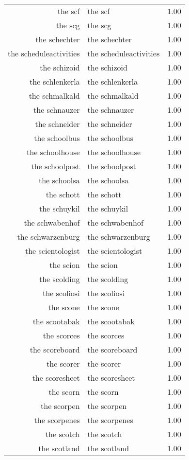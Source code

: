 \begin{table}[ht]
\begin{tabular}{rlr}
  the scf & the scf & 1.00 \\ 
  the scg & the scg & 1.00 \\ 
  the schechter & the schechter & 1.00 \\ 
  the scheduleactivities & the scheduleactivities & 1.00 \\ 
  the schizoid & the schizoid & 1.00 \\ 
  the schlenkerla & the schlenkerla & 1.00 \\ 
  the schmalkald & the schmalkald & 1.00 \\ 
  the schnauzer & the schnauzer & 1.00 \\ 
  the schneider & the schneider & 1.00 \\ 
  the schoolbus & the schoolbus & 1.00 \\ 
  the schoolhouse & the schoolhouse & 1.00 \\ 
  the schoolpost & the schoolpost & 1.00 \\ 
  the schoolsa & the schoolsa & 1.00 \\ 
  the schott & the schott & 1.00 \\ 
  the schuykil & the schuykil & 1.00 \\ 
  the schwabenhof & the schwabenhof & 1.00 \\ 
  the schwarzenburg & the schwarzenburg & 1.00 \\ 
  the scientologist & the scientologist & 1.00 \\ 
  the scion & the scion & 1.00 \\ 
  the scolding & the scolding & 1.00 \\ 
  the scoliosi & the scoliosi & 1.00 \\ 
  the scone & the scone & 1.00 \\ 
  the scootabak & the scootabak & 1.00 \\ 
  the scorces & the scorces & 1.00 \\ 
  the scoreboard & the scoreboard & 1.00 \\ 
  the scorer & the scorer & 1.00 \\ 
  the scoresheet & the scoresheet & 1.00 \\ 
  the scorn & the scorn & 1.00 \\ 
  the scorpen & the scorpen & 1.00 \\ 
  the scorpenes & the scorpenes & 1.00 \\ 
  the scotch & the scotch & 1.00 \\ 
  the scotland & the scotland & 1.00 \\ 

\end{tabular}
\end{table}
